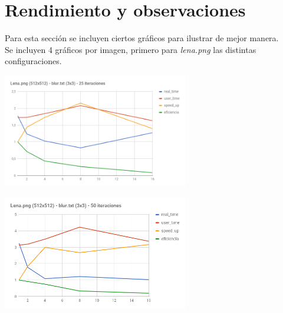 \documentclass[letterpaper,10pt]{article}
\begin{document}
\section{Rendimiento y observaciones}

Para esta sección se incluyen ciertos gráficos para ilustrar de mejor manera.\\

Se incluyen 4 gráficos por imagen, primero para \textit{lena.png} las distintas configuraciones.\\
\begin{minipage}{0.5\linewidth}
\includegraphics[height=5cm]{chart.png}
\end{minipage}
\begin{minipage}{0.5\linewidth}
\includegraphics[height=5cm]{chart__1_.png}
\end{minipage}
\end{document}
